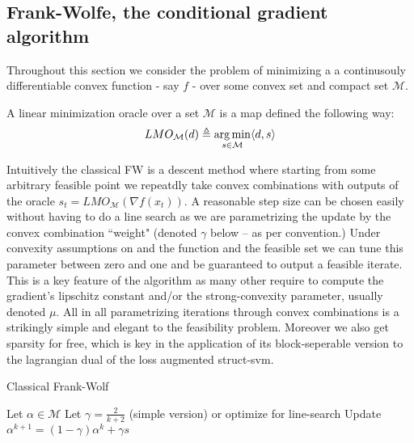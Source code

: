 \subsection{Frank-Wolfe, the conditional gradient algorithm}
Throughout this section we consider the problem of minimizing a
a continusouly differentiable convex function - say $f$ - over some convex set
and compact set $\mathcal M$.
\begin{definition}
  A linear minimization oracle over a set $\mathcal M$ is a map defined the following way:
  \begin{equation}
    LMO_{\mathcal{M}}(d) \triangleq \operatorname*{\arg\min}_{s \in\mathcal{M}}\langle d, s \rangle
    \label{eq:lmo}
  \end{equation}
\end{definition}


Intuitively the classical FW is a descent method where starting from some
arbitrary feasible point we repeatdly take convex combinations with outputs of
the oracle $s_{t}= LMO_{\mathcal{M}}(\nabla f(x_{t}))$. A reasonable step size
can be chosen easily without having to do a line search as we are parametrizing
the update by the convex combination ``weight" (denoted $\gamma$ below -- as per
convention.) Under convexity assumptions on and the function and the feasible
set we can tune this parameter between zero and one and be guaranteed to output
a feasible iterate. This is a key feature of the algorithm as many other require
to compute the gradient's lipschitz constant and/or the strong-convexity
parameter, usually denoted $\mu$. All in all parametrizing iterations through
convex combinations is a strikingly simple and elegant to the feasibility
problem. Moreover we also get sparsity for free, which is key in the application
of its block-seperable version to the lagrangian dual of the loss augmented
struct-svm.

\begin{algorithm}[htbp!]
  \caption{Classical Frank-Wolf}
\begin{algorithmic}
   \STATE Let $\alpha\in\mathcal{M}$
   \STATE Let $\gamma = \frac{2}{k+2}$ (simple version) or optimize for line-search
   \STATE Update $\alpha^{k+1}= (1-\gamma)\alpha^{k}+ \gamma s$
   \ENDFOR
\end{algorithmic}
\end{algorithm}

